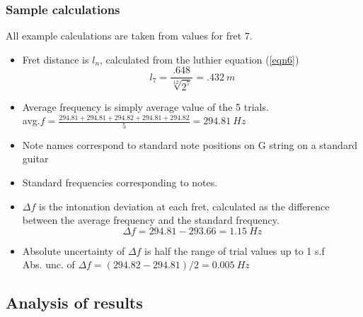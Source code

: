\documentclass[11pt]{article}
\begin{document}
\begin{flushleft}
            \subsubsection*{Sample calculations}
            All example calculations are taken from values for fret 7.
            \begin{itemize}
                \item Fret distance is $l_n$, calculated from the luthier equation (\ref{eqn6})
                $$l_7 = \frac{.648}{\sqrt[12]{2^7}} = \SI{.432}{m}$$
                \item Average frequency is simply average value of the 5 trials.\\
                avg.$f = \frac{294.81 + 294.81 + 294.82 + 294.81 + 294.82 }{5} = \SI{294.81}{Hz}$
                \item Note names correspond to standard note positions on G string on a standard guitar
                \item Standard frequencies corresponding to notes. \cite{freq_chart} 
                \item $\Delta f$ is the intonation deviation at each fret, calculated as the difference between the average frequency and the standard frequency.
                $$\Delta f = 294.81 - 293.66 = \SI{1.15}{Hz}$$
                \item Absolute uncertainty of $\Delta f$ is half the range of trial values up to 1 s.f \\
                Abs. unc. of $\Delta f = (294.82-294.81)/2 = \SI{0.005}{Hz}$
            \end{itemize}
        \subsection{Analysis of results}

\end{flushleft}
\end{document}
